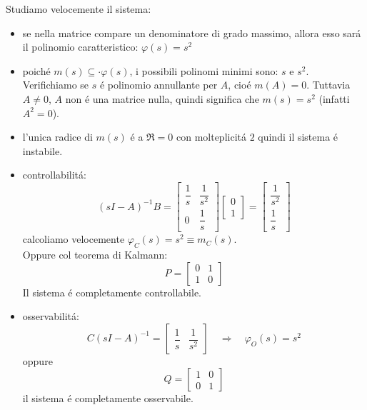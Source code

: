 \documentclass[../main.tex]{subfiles}
\begin{document}
\begin{Exercise}[title={Retroazione algebrica sull'uscita}, difficulty=1]
			Studiamo velocemente il sistema:
			\begin{itemize}
				\item 
					se nella matrice compare un denominatore di grado massimo, allora esso sar\'a il polinomio caratteristico: $ \varphi(s) = s^2 $
				\item 
					poich\'e $ m(s) \subseteq\cdot \varphi(s) $, i possibili polinomi minimi sono: $ s $ e $ s^2 $. Verifichiamo se $ s $ \'e polinomio annullante per $ A $, cio\'e $ m(A) = 0 $. Tuttavia $ A \neq 0 $, $ A $ non \'e una matrice nulla, quindi significa che $ m(s) = s^2 $ (infatti $ A^2 = 0 $).
				\item 
					l'unica radice di $ m(s) $ \'e a $ \Re = 0 $ con molteplicit\'a $ 2 $ quindi il sistema \'e instabile.
				\item 
					controllabilit\'a:
					\[
						(sI-A)^{-1}B=
						\begin{bmatrix}
							\dfrac{1}{s} & \dfrac{1}{s^2}\\
							0 & \dfrac{1}{s}
						\end{bmatrix}
						\begin{bmatrix}
							0\\
							1
						\end{bmatrix} =
						\begin{bmatrix}
							\dfrac{1}{s^2}\\
							\dfrac{1}{s}
						\end{bmatrix}
					\]
					calcoliamo velocemente $ \varphi_C(s) = s^2 \equiv m_C(s) $.\\
					Oppure col teorema di Kalmann:
					\[
						P =
						\begin{bmatrix}
							0 & 1\\
							1 & 0
						\end{bmatrix}
					\]
					Il sistema \'e completamente controllabile.
				\item 
					osservabilit\'a:
					\[
						C(sI-A)^{-1} = 
						\begin{bmatrix}
							\dfrac{1}{s} & \dfrac{1}{s^2}
						\end{bmatrix}
						\quad\Rightarrow\quad \varphi_O(s) = s^2
					\]
					oppure
					\[
						Q =
						\begin{bmatrix}
							1 & 0\\
							0 & 1
						\end{bmatrix}
					\]
					il sistema \'e completamente osservabile.
			\end{itemize}
			\begin{enumerate}

\end{enumerate}
\end{Exercise}
\end{document}
